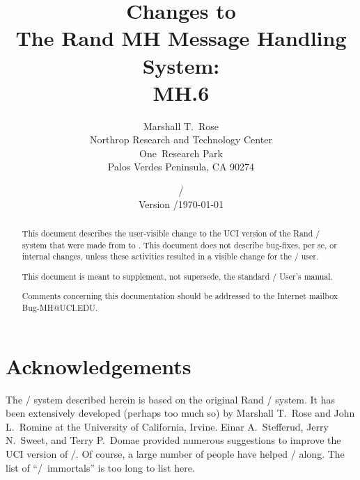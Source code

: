 



\setcounter{page}{0}
\pagestyle{empty}



\title{Changes to\\ The Rand MH Message Handling System:\\ MH.6}
\author{Marshall T.~Rose\\
	Northrop Research and Technology Center\\
	One~Research Park\\
	Palos Verdes Peninsula, CA  90274}
\date{\ifdraft \versiondate/\\ Version \versiontag/\else \today\fi}
\maketitle
{}%

\begin{abstract}
\noindent This document describes the user-visible change to the
UCI version of the Rand \MH/ system that were made from  to .
This document does not describe bug-fixes, per se,
or internal changes,
unless these activities resulted in a visible change for the \MH/ user.

This document is meant to supplement,
not supersede, the standard \MH/ User's manual\cite{MH}.

Comments concerning this documentation should be addressed to the Internet
mailbox {\sf Bug-MH@UCI.EDU}.
\end{abstract}

\bop\pagestyle{plain}

\section*	{Acknowledgements}
The \MH/ system described herein is based on the original Rand \MH/ system.
It has been extensively developed (perhaps too much so) by Marshall T.~Rose
and John L.~Romine at the University of California, Irvine.
Einar A.~Stefferud, Jerry N.~Sweet,
and Terry P.~Domae provided numerous suggestions
to improve the UCI version of \MH/.
Of course,
a large number of people have helped \MH/ along.
The list of ``\MH/~immortals'' is too long to list here.

